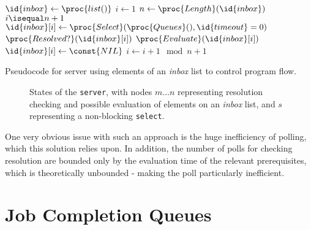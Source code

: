 \documentclass[a4paper,10pt]{article}
\begin{document}
\begin{srcclrs}
\begin{codebox}
	\li \(\id{inbox} \gets \proc{list()}\)
	\li \(i \gets 1\)
	\li \Repeat
	\li \(n \gets \proc{Length}(\id{inbox})\)
	\li \If \(i \isequal n + 1\)
	\li \Then
	\(\id{inbox}[i] \gets \proc{Select}(\proc{Queues}(), \id{timeout}=0)\)
	\End
	\li \If \(\proc{Resolved?}(\id{inbox}[i])\)
	\li \Then
	\(\proc{Evaluate}(\id{inbox}[i])\)
	\li \(\id{inbox}[i] \gets \const{NIL}\)
	\End
	\li \(i \gets i + 1 \mod n + 1\)
	\End
\end{codebox}
	\caption{\label{src:q-state}Pseudocode for server using elements of an
	\textit{inbox} list to control program flow.}
\end{srcclrs}

\begin{figure}
	\centering
	\caption{\label{fig:q-state}States of the \texttt{server}, with nodes
	\(m \dots n\) representing resolution checking and possible evaluation
	of elements on an \textit{inbox} list, and \(s\) representing a
	non-blocking \texttt{select}.}
\end{figure}

One very obvious issue with such an approach is the huge inefficiency of
polling, which this solution relies upon.
In addition, the number of polls for checking resolution are bounded only by
the evaluation time of the relevant prerequisites, which is theoretically
unbounded - making the poll particularly inefficient.

\section{Job Completion Queues}
\end{document}
